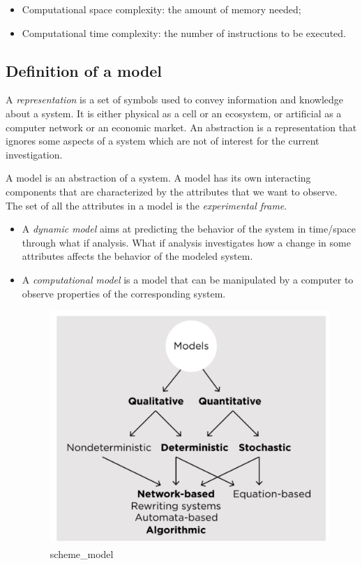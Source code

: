 \begin{itemize}
\tightlist
\item
  Computational space complexity: the amount of memory needed;
\item
  Computational time complexity: the number of instructions to be
  executed.
\end{itemize}

\hypertarget{definition-of-a-model}{%
\subsection{Definition of a model}\label{definition-of-a-model}}

A \emph{representation} is a set of symbols used to convey information
and knowledge about a system. It is either physical as a cell or an
ecosystem, or artificial as a computer network or an economic market. An
abstraction is a representation that ignores some aspects of a system
which are not of interest for the current investigation.

A model is an abstraction of a system. A model has its own interacting
components that are characterized by the attributes that we want to
observe. The set of all the attributes in a model is the
\emph{experimental frame}.

\begin{itemize}
\item
  A \emph{dynamic model} aims at predicting the behavior of the system
  in time/space through what if analysis. What if analysis investigates
  how a change in some attributes affects the behavior of the modeled
  system.
\item
  A \emph{computational model} is a model that can be manipulated by a
  computer to observe properties of the corresponding system.

  \begin{figure}
  \centering
  \includegraphics{scheme_model.png}
  \caption{scheme\_model}
  \end{figure}
\end{itemize}

